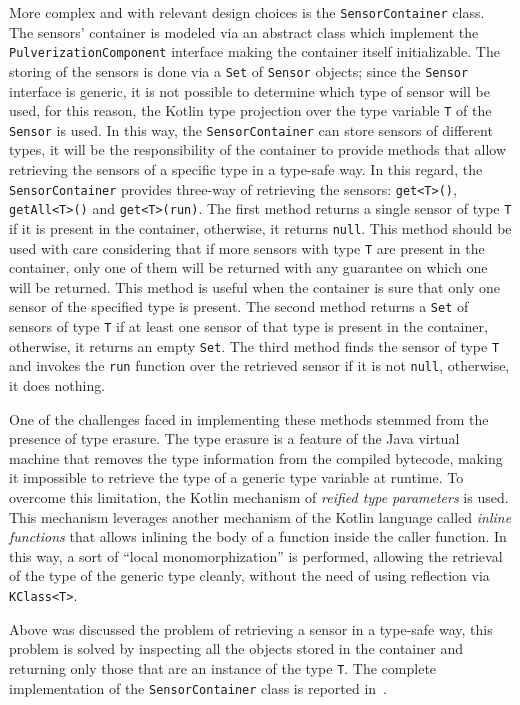 More complex and with relevant design choices is the \texttt{SensorContainer} class. The sensors' container is modeled via an abstract class
which implement the \texttt{PulverizationComponent} interface making the container itself initializable.
The storing of the sensors is done via a \texttt{Set} of \texttt{Sensor} objects; since the \texttt{Sensor} interface is generic, it is not possible
to determine which type of sensor will be used, for this reason, the Kotlin type projection over the type variable \texttt{T} of the \texttt{Sensor}
is used. In this way, the \texttt{SensorContainer} can store sensors of different types, it will be the responsibility of the container to provide
methods that allow retrieving the sensors of a specific type in a type-safe way.
In this regard, the \texttt{SensorContainer} provides three-way of retrieving the sensors: \texttt{get<T>()}, \texttt{getAll<T>()} and
\texttt{get<T>(run)}.
The first method returns a single sensor of type \texttt{T} if it is present in the container, otherwise, it returns \texttt{null}.
This method should be used with care considering that if more sensors with type \texttt{T} are present in the container, only one of them will be
returned with any guarantee on which one will be returned. This method is useful when the container is sure that only one sensor of the specified
type is present.
The second method returns a \texttt{Set} of sensors of type \texttt{T} if at least one sensor of that type is present in the container, otherwise,
it returns an empty \texttt{Set}.
The third method finds the sensor of type \texttt{T} and invokes the \texttt{run} function over the retrieved sensor if it is not \texttt{null},
otherwise, it does nothing.

One of the challenges faced in implementing these methods stemmed from the presence of type erasure.
The type erasure is a feature of the Java virtual machine that removes the type information from the compiled bytecode, making it impossible to
retrieve the type of a generic type variable at runtime. To overcome this limitation, the Kotlin mechanism of \emph{reified type parameters} is used.
This mechanism leverages another mechanism of the Kotlin language called \emph{inline functions} that allows inlining the body of a function
inside the caller function. In this way, a sort of ``local monomorphization'' is performed, allowing the retrieval of the type of the generic type
cleanly, without the need of using reflection via \texttt{KClass<T>}.

Above was discussed the problem of retrieving a sensor in a type-safe way, this problem is solved by inspecting all the objects stored in the
container and returning only those that are an instance of the type \texttt{T}.
The complete implementation of the \texttt{SensorContainer} class is reported in~.


